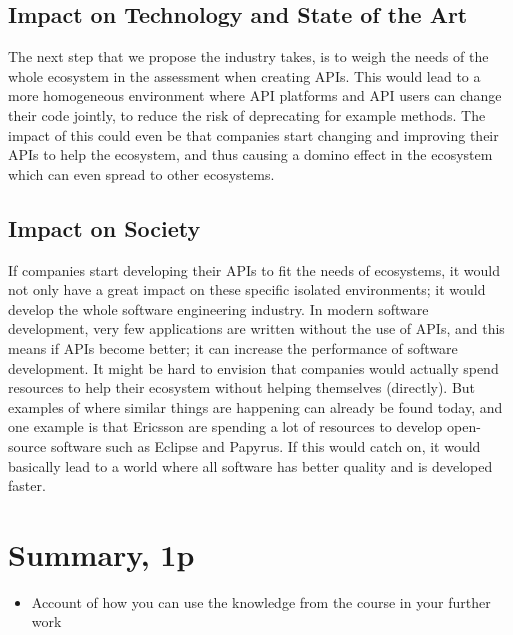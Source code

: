 \documentclass{article}
\begin{document}
\subsection{Impact on Technology and State of the Art}
The next step that we propose the industry takes, is to weigh the needs of the whole ecosystem in the assessment when creating APIs. This would lead to a more homogeneous environment where API platforms and API users can change their code jointly, to reduce the risk of deprecating for example methods. The impact of this could even be that companies start changing and improving their APIs to help the ecosystem, and thus causing a domino effect in the ecosystem which can even spread to other ecosystems. 

\subsection{Impact on Society}
If companies start developing their APIs to fit the needs of ecosystems, it would not only have a great impact on these specific isolated environments; it would develop the whole software engineering industry. In modern software development, very few applications are written without the use of APIs, and this means if APIs become better; it can increase the performance of software development. It might be hard to envision that companies would actually spend resources to help their ecosystem without helping themselves (directly). But examples of where similar things are happening can already be found today, and one example is that Ericsson are spending a lot of resources to develop open-source software such as Eclipse and Papyrus. If this would catch on, it would basically lead to a world where all software has better quality and is developed faster. 

\section{Summary, 1p}

\begin{itemize}
	\item Account of how you can use the knowledge from the course in your further work
\end{itemize}
\end{document}
